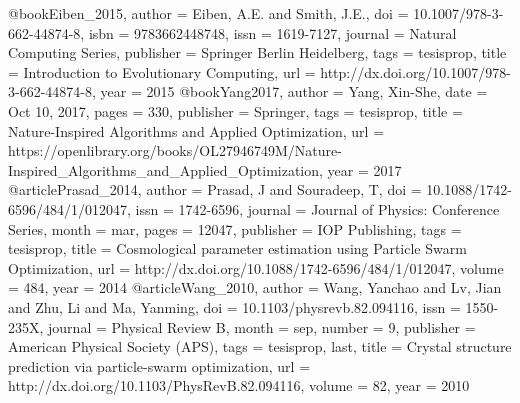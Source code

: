 @book{Eiben_2015,
 author = {Eiben, A.E. and Smith, J.E.},
 doi = {10.1007/978-3-662-44874-8},
 isbn = {9783662448748},
 issn = {1619-7127},
 journal = {Natural Computing Series},
 publisher = {Springer Berlin Heidelberg},
 tags = {tesisprop},
 title = {Introduction to Evolutionary Computing},
 url = {http://dx.doi.org/10.1007/978-3-662-44874-8},
 year = {2015}
}
@book{Yang2017,
 author = {Yang, Xin-She},
 date = {Oct 10, 2017},
 pages = {330},
 publisher = {Springer},
 tags = {tesisprop},
 title = {Nature-Inspired Algorithms and Applied Optimization},
 url = {https://openlibrary.org/books/OL27946749M/Nature-Inspired_Algorithms_and_Applied_Optimization},
 year = {2017}
}
@article{Prasad_2014,
 author = {Prasad, J and Souradeep, T},
 doi = {10.1088/1742-6596/484/1/012047},
 issn = {1742-6596},
 journal = {Journal of Physics: Conference Series},
 month = mar,
 pages = {12047},
 publisher = {IOP Publishing},
 tags = {tesisprop},
 title = {Cosmological parameter estimation using Particle Swarm Optimization},
 url = {http://dx.doi.org/10.1088/1742-6596/484/1/012047},
 volume = {484},
 year = {2014}
}
@article{Wang_2010,
 author = {Wang, Yanchao and Lv, Jian and Zhu, Li and Ma, Yanming},
 doi = {10.1103/physrevb.82.094116},
 issn = {1550-235X},
 journal = {Physical Review B},
 month = sep,
 number = {9},
 publisher = {American Physical Society (APS)},
 tags = {tesisprop, last},
 title = {Crystal structure prediction via particle-swarm optimization},
 url = {http://dx.doi.org/10.1103/PhysRevB.82.094116},
 volume = {82},
 year = {2010}
}

